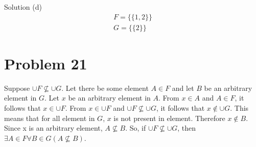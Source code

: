 \documentclass{article}
\begin{document}
Solution (d)
\begin{align*}
F = \{\{1,2\}\} \\
G = \{\{2\}\}  
\end{align*}

\section{Problem 21}

Suppose $\cup F \nsubseteq \cup G$. Let there be some element $A \in
F$ and let $B$ be an arbitrary element in $G$. Let $x$ be an arbitrary
element in $A$. From $x \in A$ and $A \in F$, it follows that $x \in
\cup F$. From $x \in \cup F$ and $\cup F \nsubseteq \cup G$, it
follows that $x \notin \cup G$. This means that for all element in
$G$, $x$ is not present in element. Therefore $x \notin B$. Since x is
an arbitrary element, $A \nsubseteq B$. So, if $\cup F \nsubseteq \cup
G$, then $\exists A \in F \forall B \in G (A \nsubseteq B)$.
\end{document}
